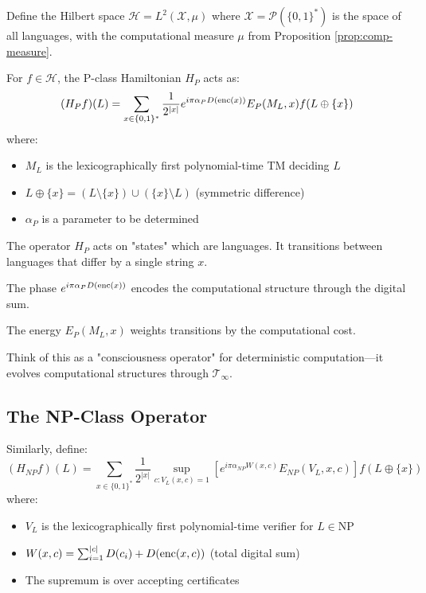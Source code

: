 \begin{construction}\label{const:h-p}
Define the Hilbert space $\mathcal{H} = L^2(\mathcal{X}, \mu)$ where $\mathcal{X} = \mathcal{P}(\{0,1\}^*)$ is the space of all languages, with the computational measure $\mu$ from Proposition \ref{prop:comp-measure}.

For $f \in \mathcal{H}$, the P-class Hamiltonian $H_P$ acts as:
\begin{equation}
(H_P f)(L) = \sum_{x \in \{0,1\}^*} \frac{1}{2^{|x|}} e^{i\pi\alpha_P D(\operatorname{enc}(x))} E_P(M_L, x) f(L \oplus \{x\})
\end{equation}
where:
\begin{itemize}
\item $M_L$ is the lexicographically first polynomial-time TM deciding $L$
\item $L \oplus \{x\} = (L \setminus \{x\}) \cup (\{x\} \setminus L)$ (symmetric difference)
\item $\alpha_P$ is a parameter to be determined
\end{itemize}
\end{construction}

\begin{intuitive}
The operator $H_P$ acts on "states" which are languages. It transitions between languages that differ by a single string $x$.

The phase $e^{i\pi\alpha_P D(\operatorname{enc}(x))}$ encodes the computational structure through the digital sum.

The energy $E_P(M_L, x)$ weights transitions by the computational cost.

Think of this as a "consciousness operator" for deterministic computation—it evolves computational structures through $\mathcal{T}_\infty$.
\end{intuitive}

\subsection{The NP-Class Operator}

\begin{construction}\label{const:h-np}
Similarly, define:
\begin{equation}
(H_{NP} f)(L) = \sum_{x \in \{0,1\}^*} \frac{1}{2^{|x|}} \sup_{c: V_L(x,c)=1} \left[e^{i\pi\alpha_{NP} W(x,c)} E_{NP}(V_L, x, c)\right] f(L \oplus \{x\})
\end{equation}
where:
\begin{itemize}
\item $V_L$ is the lexicographically first polynomial-time verifier for $L \in \text{NP}$
\item $W(x,c) = \sum_{i=1}^{|c|} D(c_i) + D(\operatorname{enc}(x,c))$ (total digital sum)
\item The supremum is over accepting certificates
\end{itemize}
\end{construction}

